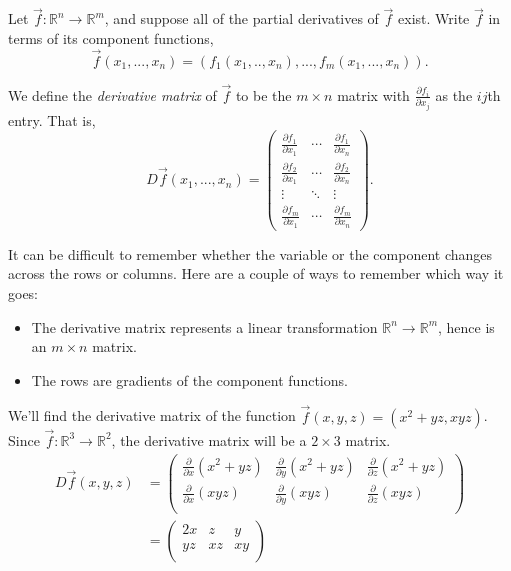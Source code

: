\documentclass{ximera}
\begin{document}
\begin{definition}
Let $\vec{f}:\mathbb{R}^n\rightarrow\mathbb{R}^m$, and suppose all of the partial derivatives of $\vec{f}$ exist. Write $\vec{f}$ in terms of its component functions,
\[
\vec{f}(x_1,...,x_n) = (f_1(x_1,..,x_n),...,f_m(x_1,...,x_n)).
\]

We define the \emph{derivative matrix} of $\vec{f}$ to be the $m\times n$ matrix with $\frac{\partial f_i}{\partial x_j}$ as the $ij$th entry. That is,
\[
D\vec{f}(x_1,...,x_n) = \begin{pmatrix}
\frac{\partial f_1}{\partial x_1} & \cdots & \frac{\partial f_1}{\partial x_n}\\
\frac{\partial f_2}{\partial x_1} & \cdots & \frac{\partial f_2}{\partial x_n}\\
\vdots & \ddots & \vdots\\
\frac{\partial f_m}{\partial x_1} & \cdots & \frac{\partial f_m}{\partial x_n}
\end{pmatrix}.
\]
\end{definition}

It can be difficult to remember whether the variable or the component changes across the rows or columns. Here are a couple of ways to remember which way it goes:
\begin{itemize}
\item The derivative matrix represents a linear transformation $\mathbb{R}^n\rightarrow\mathbb{R}^m$, hence is an $m\times n$ matrix.
\item The rows are gradients of the component functions.
\end{itemize}

\begin{example}
We'll find the derivative matrix of the function $\vec{f}(x,y,z) = (x^2+yz, xyz)$. Since $\vec{f}:\mathbb{R}^3\rightarrow\mathbb{R}^2$, the derivative matrix will be a $2\times 3$ matrix.
\begin{align*}
D\vec{f}(x,y,z) &= \begin{pmatrix}
\frac{\partial}{\partial x} (x^2+yz) & \frac{\partial}{\partial y} (x^2+yz) & \frac{\partial}{\partial z} (x^2+yz)\\
\frac{\partial}{\partial x} (xyz) & \frac{\partial}{\partial y} (xyz) & \frac{\partial}{\partial z} (xyz)\\
\end{pmatrix}\\
& = \begin{pmatrix}
2x & z & y\\
yz & xz & xy\\
\end{pmatrix}
\end{align*}
\end{example}
\end{document}
